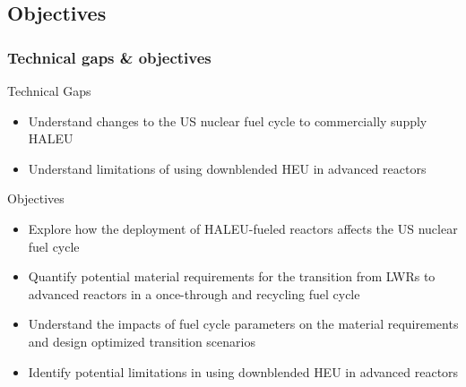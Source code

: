 \subsection{Objectives}
\begin{frame}
    \frametitle{Technical gaps \& objectives}
    \begin{block}{Technical Gaps}
        \begin{itemize}
            \item Understand changes to the US nuclear fuel cycle to 
                  commercially supply \gls{HALEU}
            \item Understand limitations of using downblended \gls{HEU} 
                  in advanced reactors         
        \end{itemize}
    \end{block}
    \pause
    \begin{block}{Objectives}
        \begin{itemize}
        \item<2-> Explore how the deployment of \gls{HALEU}-fueled reactors 
        affects the US nuclear fuel cycle 
        \item<2-> Quantify potential material requirements for the transition from 
              \glspl{LWR} to advanced reactors in a once-through and recycling 
              fuel cycle
        \item<2-> Understand the impacts of fuel cycle parameters on the 
              material requirements and design optimized transition scenarios
        \item<2-> Identify potential limitations in using downblended \gls{HEU} 
              in advanced reactors
        \end{itemize}
    \end{block}
\end{frame}